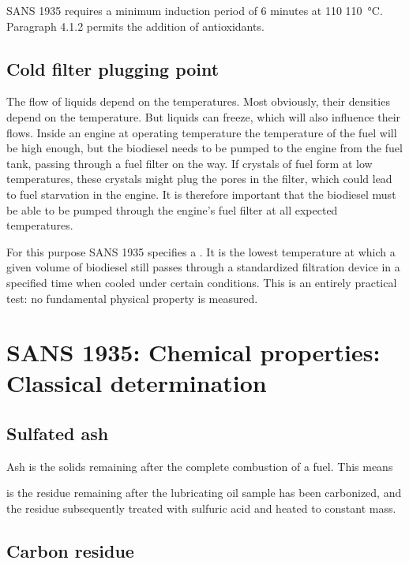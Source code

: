 SANS 1935 requires a minimum induction period of 6 minutes at 110
\SI{110}{\celsius}. Paragraph 4.1.2 permits the addition of antioxidants.

\subsection{Cold filter plugging point}

The flow of liquids depend on the temperatures. Most obviously, their densities
depend on the temperature. But liquids can freeze, which will also influence
their flows. Inside an engine at operating temperature the temperature of the
fuel will be high enough, but the biodiesel needs to be pumped to the engine
from the fuel tank, passing through a fuel filter on the way. If crystals of
fuel form at low temperatures, these crystals might plug the pores in the
filter, which could lead to fuel starvation in the engine. It is therefore
important that the biodiesel must be able to be pumped through the engine's fuel
filter at all expected temperatures.

For this purpose SANS 1935 specifies a . It
is the lowest temperature at which a given volume of biodiesel still passes
through a standardized filtration device in a specified time when cooled under
certain conditions. This is an entirely practical test: no fundamental
physical property is measured.

\section{SANS 1935: Chemical properties: Classical determination}

\subsection{Sulfated ash}

Ash is the solids remaining after the complete combustion of a fuel. This means

 is the residue remaining after the lubricating oil sample has been
carbonized, and the residue subsequently treated with sulfuric acid and heated
to constant mass.



\subsection{Carbon residue}

